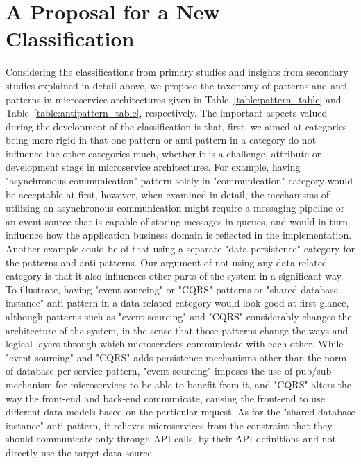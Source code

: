 \documentclass{Configuration_Files/PoliMi3i_thesis}
\begin{document}
\section{A Proposal for a New Classification}
\label{sec:proposal}

Considering the classifications from primary studies and insights from secondary studies explained in detail above, we propose the taxonomy of patterns and anti-patterns in microservice architectures given in Table~\ref{table:pattern_table} and Table~\ref{table:antipattern_table}, respectively.
The important aspects valued during the development of the classification is that, first, we aimed at categories being more rigid in that one pattern or anti-pattern in a category do not influence the other categories much, whether it is a challenge, attribute or development stage in microservice architectures.
For example, having "asynchronous communication" pattern solely in "communication" category would be acceptable at first, however, when examined in detail, the mechanisms of utilizing an asynchronous communication might require a messaging pipeline or an event source that is capable of storing messages in queues, and would in turn influence how the application business domain is reflected in the implementation.
Another example could be of that using a separate "data persistence" category for the patterns and anti-patterns.
Our argument of not using any data-related category is that it also influences other parts of the system in a significant way.
To illustrate, having "event sourcing" or "CQRS" patterns or "shared database instance" anti-pattern in a data-related category would look good at first glance, although patterns such as "event sourcing" and "CQRS" considerably changes the architecture of the system, in the sense that those patterns change the ways and logical layers through which microservices communicate with each other.
While "event sourcing" and "CQRS" adds persistence mechanisms other than the norm of database-per-service pattern, "event sourcing" imposes the use of pub/sub mechanism for microservices to be able to benefit from it, and "CQRS" alters the way the front-end and back-end communicate, causing the front-end to use different data models based on the particular request.
As for the "shared database instance" anti-pattern, it relieves microservices from the constraint that they should communicate only through API calls, by their API definitions and not directly use the target data source.
\\
\end{document}

